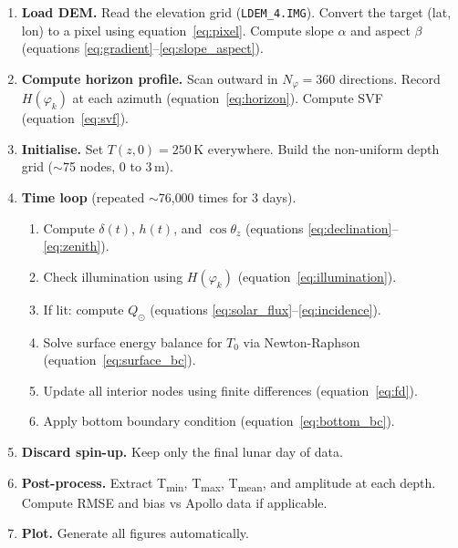 \documentclass[12pt, a4paper]{article}
\begin{document}
\begin{enumerate}[leftmargin=1.8em, itemsep=5pt]
  \item \textbf{Load DEM.}
        Read the elevation grid (\texttt{LDEM\_4.IMG}).
        Convert the target (lat, lon) to a pixel using
        equation~\eqref{eq:pixel}.
        Compute slope $\alpha$ and aspect $\beta$
        (equations \ref{eq:gradient}--\ref{eq:slope_aspect}).

  \item \textbf{Compute horizon profile.}
        Scan outward in $N_{\varphi}=360$ directions.
        Record $H(\varphi_k)$ at each azimuth
        (equation~\ref{eq:horizon}).
        Compute SVF (equation~\ref{eq:svf}).

  \item \textbf{Initialise.}
        Set $T(z,0) = 250$\,K everywhere.
        Build the non-uniform depth grid ($\sim$75 nodes,
        0 to 3\,m).

  \item \textbf{Time loop} (repeated $\sim$76{,}000 times for 3 days).
    \begin{enumerate}[leftmargin=1.4em, itemsep=3pt]
      \item Compute $\delta(t)$, $h(t)$, and $\cos\theta_z$
            (equations \ref{eq:declination}--\ref{eq:zenith}).
      \item Check illumination using $H(\varphi_k)$
            (equation~\ref{eq:illumination}).
      \item If lit: compute $Q_{\odot}$
            (equations \ref{eq:solar_flux}--\ref{eq:incidence}).
      \item Solve surface energy balance for $T_0$ via
            Newton-Raphson (equation~\ref{eq:surface_bc}).
      \item Update all interior nodes using finite differences
            (equation~\ref{eq:fd}).
      \item Apply bottom boundary condition
            (equation~\ref{eq:bottom_bc}).
    \end{enumerate}

  \item \textbf{Discard spin-up.}
        Keep only the final lunar day of data.

  \item \textbf{Post-process.}
        Extract T\textsubscript{min}, T\textsubscript{max},
        T\textsubscript{mean}, and amplitude at each depth.
        Compute RMSE and bias vs Apollo data if applicable.

  \item \textbf{Plot.}
        Generate all figures automatically.
\end{enumerate}
\end{document}
